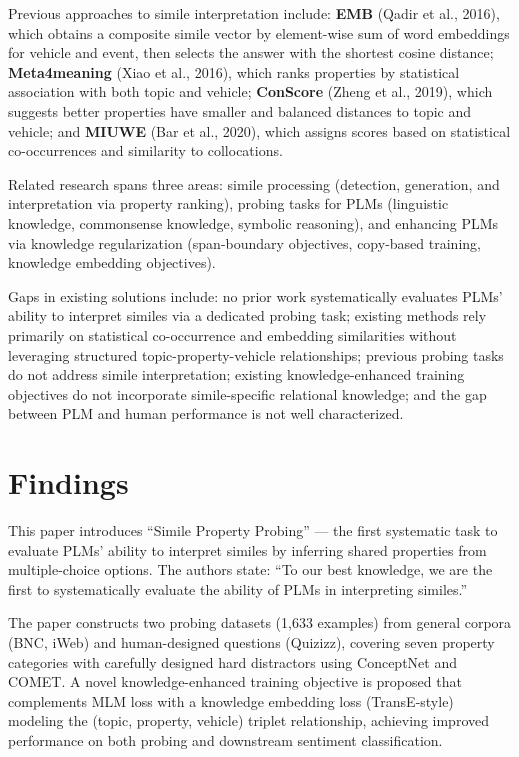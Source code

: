 \documentclass[12pt]{article}
\begin{document}
Previous approaches to simile interpretation include: \textbf{EMB} (Qadir et al., 2016), which obtains a composite simile vector by element-wise sum of word embeddings for vehicle and event, then selects the answer with the shortest cosine distance; \textbf{Meta4meaning} (Xiao et al., 2016), which ranks properties by statistical association with both topic and vehicle; \textbf{ConScore} (Zheng et al., 2019), which suggests better properties have smaller and balanced distances to topic and vehicle; and \textbf{MIUWE} (Bar et al., 2020), which assigns scores based on statistical co-occurrences and similarity to collocations.

Related research spans three areas: simile processing (detection, generation, and interpretation via property ranking), probing tasks for PLMs (linguistic knowledge, commonsense knowledge, symbolic reasoning), and enhancing PLMs via knowledge regularization (span-boundary objectives, copy-based training, knowledge embedding objectives).

Gaps in existing solutions include: no prior work systematically evaluates PLMs' ability to interpret similes via a dedicated probing task; existing methods rely primarily on statistical co-occurrence and embedding similarities without leveraging structured topic-property-vehicle relationships; previous probing tasks do not address simile interpretation; existing knowledge-enhanced training objectives do not incorporate simile-specific relational knowledge; and the gap between PLM and human performance is not well characterized.

\section{Findings}

This paper introduces ``Simile Property Probing'' --- the first systematic task to evaluate PLMs' ability to interpret similes by inferring shared properties from multiple-choice options. The authors state: ``To our best knowledge, we are the first to systematically evaluate the ability of PLMs in interpreting similes.''

The paper constructs two probing datasets (1,633 examples) from general corpora (BNC, iWeb) and human-designed questions (Quizizz), covering seven property categories with carefully designed hard distractors using ConceptNet and COMET. A novel knowledge-enhanced training objective is proposed that complements MLM loss with a knowledge embedding loss (TransE-style) modeling the (topic, property, vehicle) triplet relationship, achieving improved performance on both probing and downstream sentiment classification.
\end{document}
